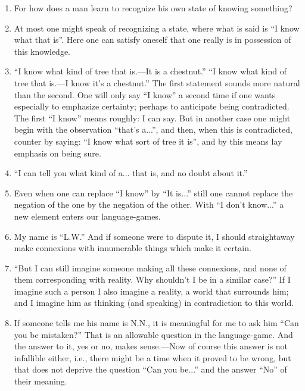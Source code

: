 \documentclass{book}
\begin{document}
\begin{enumerate}
\item
For how does a man learn to recognize his own state of knowing something?

\item
At most one might speak of recognizing a state, where what is said is ``I know
what that is''. Here one can satisfy oneself that one really is in possession
of this knowledge.

\item
``I know what kind of tree that is.---It is a chestnut.'' ``I know what kind of
tree that is.---I know it's a chestnut.'' The first statement sounds more
natural than the second. One will only say ``I know'' a second time if one
wants especially to emphasize certainty; perhaps to anticipate being
contradicted. The first ``I know'' means roughly: I can say.  But in another
case one might begin with the observation ``that's a...'', and then, when this
is contradicted, counter by saying: ``I know what sort of tree it is'', and by
this means lay emphasis on being sure.

\item
``I can tell you what kind of a... that is, and no doubt about it.''

\item
Even when one can replace ``I know'' by ``It is...'' still one cannot replace
the negation of the one by the negation of the other.  With ``I don't know...''
a new element enters our language-games.

\item
My name is ``L.W.'' And if someone were to dispute it, I should straightaway
make connexions with innumerable things which make it certain.

\item
``But I can still imagine someone making all these connexions, and none of them
corresponding with reality. Why shouldn't I be in a similar case?'' If I
imagine such a person I also imagine a reality, a world that surrounds him; and
I imagine him as thinking (and speaking) in contradiction to this world.

\item
If someone tells me his name is N.N., it is meaningful for me to ask him ``Can
you be mistaken?'' That is an allowable question in the language-game. And the
answer to it, yes or no, makes sense.---Now of course this answer is not
infallible either, i.e., there might be a time when it proved to be wrong, but
that does not deprive the question ``Can you be...'' and the answer ``No'' of
their meaning.


\end{enumerate}
\end{document}
